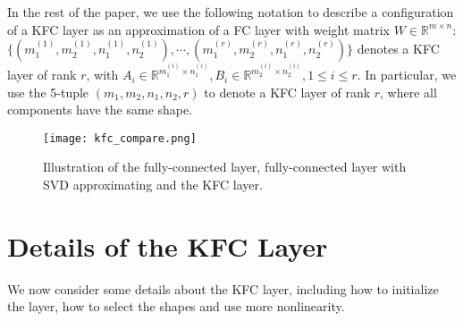 \documentclass{article}
\begin{document}
In the rest of the paper, we use the following notation to describe a configuration of a KFC layer as an approximation of
a FC layer with weight matrix $W \in \mathbb{R}^{m\times n}$: $ \{ (m_1^{(1)},m_2^{(1)}, n_1^{(1)}, n_2^{(1)}),\cdots ,(m_1^{(r)},m_2^{(r)},
n_1^{(r)},n_2^{(r)}) \}$ denotes a KFC layer of rank $r$,
with $ A_i \in \mathbb{R}^{m_1^{(i)}\times n_1^{(i)}}, B_i\in \mathbb{R}^{m_2^{(i)} \times n_2^{(i)}}, 1\le i \le r$.
In particular, we use the 5-tuple $ (m_1, m_2, n_1, n_2, r)$ to denote a KFC layer of rank $r$, where all components have the same shape.
\begin{figure}
\centering
\texttt{[image: kfc\_compare.png]}
\caption{Illustration of the fully-connected layer, fully-connected layer with SVD approximating and the KFC layer.}
\label{fig:kfc_compare}
\end{figure}

\section{Details of the KFC Layer}
We now consider some details about the KFC layer, including how to initialize the layer, how to select the shapes and use more nonlinearity.
\end{document}
